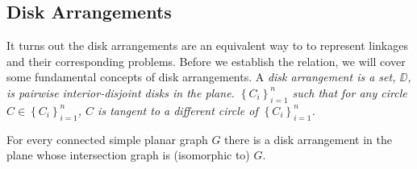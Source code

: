 \subsection{Disk Arrangements}
It turns out the disk arrangements are an equivalent way to to represent linkages and their 
corresponding problems.  Before we establish the relation, we will cover some fundamental concepts 
of disk arrangements.  
A \it{disk arrangement} is a set, $\DD$, is pairwise interior-disjoint disks in the plane.
$\left\lbrace C_i \right\rbrace_{i = 1}^n $ such that for any circle $C \in \left\lbrace C_i 
\right\rbrace_{i = 1}^n$, $C$ is tangent to a different circle of $\left\lbrace C_i \right\rbrace_{i 
= 1}^n$. 
\begin{thm}\label{thm2-1}
For every connected simple planar graph $G$ there is a disk arrangement in the
plane whose intersection graph is (isomorphic to) $G$.
\end{thm}

